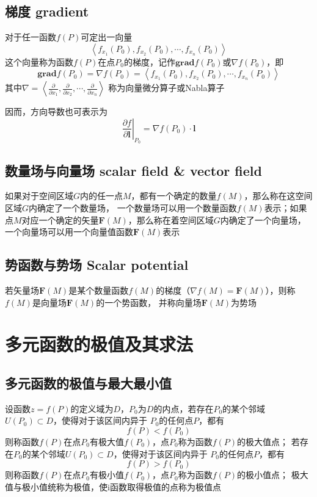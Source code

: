 \documentclass[UTF8]{ctexart}
\newcommand{\ve}[1]{{\bm{#1}}}
\newcommand{\when}[2]{{\left.{#1}\right|_{#2}}}
\begin{document}
\subsection*{梯度 gradient}
对于任一函数$f(P)$可定出一向量
\[\left\langle f_{x_1}(P_0),f_{x_2}(P_0),\cdots,f_{x_n}(P_0) \right\rangle\]
这个向量称为函数$f(P)$在点$P_0$的梯度，记作$\textbf{grad}f(P_0)$或$\nabla f(P_0)$，即
\[ \textbf{grad}f(P_0)=\nabla f(P_0)=\left\langle f_{x_1}(P_0),f_{x_2}(P_0),\cdots,f_{x_n}(P_0) \right\rangle \]
其中$\displaystyle\nabla = \left\langle \frac{\partial}{\partial x_1},\frac{\partial}{\partial x_2},\cdots,\frac{\partial}{\partial x_n} \right\rangle$
称为向量微分算子或Nabla算子

\bigskip

因而，方向导数也可表示为
\[\when{\frac{\partial f}{\partial \ve{l}}}{P_0}=\nabla f(P_0)\cdot\ve{l}\]

\subsection*{数量场与向量场 scalar field \& vector field}
如果对于空间区域$G$内的任一点$M$，都有一个确定的数量$f(M)$，那么称在这空间区域$G$内确定了一个数量场，
一个数量场可以用一个数量函数$f(M)$表示；如果点$M$对应一个确定的矢量$\ve{F}(M)$，那么称在着空间区域$G$内确定了一个向量场，
一个向量场可以用一个向量值函数$\ve{F}(M)$表示

\subsection*{势函数与势场 Scalar potential}
若矢量场$\ve{F}(M)$是某个数量函数$f(M)$的梯度（$\nabla f(M)=\ve{F}(M)$），则称$f(M)$是向量场$\ve{F}(M)$的一个势函数，
并称向量场$\ve{F}(M)$为势场
\bigskip
\bigskip

\section*{多元函数的极值及其求法}

\bigskip
\subsection*{多元函数的极值与最大最小值}
设函数$z=f(P)$的定义域为$D$，$P_0$为$D$的内点，若存在$P_0$的某个邻域$U(P_0)\subset D$，使得对于该区间内异于
$P_0$的任何点$P$，都有
\[ f(P)<f(P_0) \]
则称函数$f(P)$在点$P_0$有极大值$f(P_0)$，点$P_0$称为函数$f(P)$的极大值点；
若存在$P_0$的某个邻域$U(P_0)\subset D$，使得对于该区间内异于
$P_0$的任何点$P$，都有
\[ f(P)>f(P_0) \]
则称函数$f(P)$在点$P_0$有极小值$f(P_0)$，点$P_0$称为函数$f(P)$的极小值点；
极大值与极小值统称为极值，使i函数取得极值的点称为极值点
\end{document}
